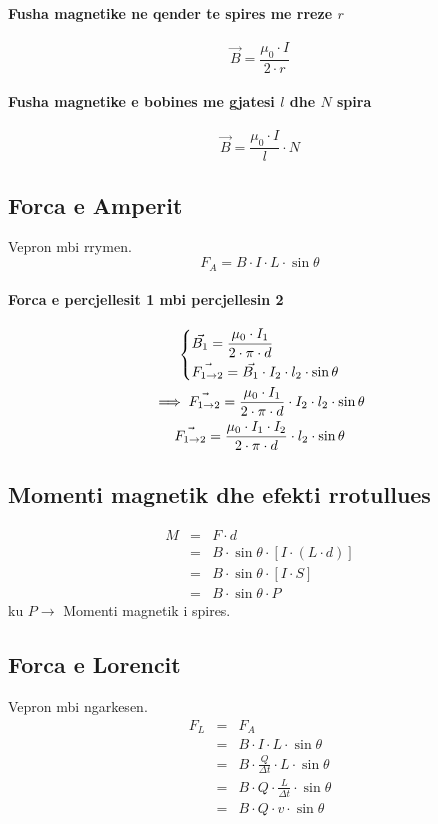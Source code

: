 \documentclass[a4paper, twocolumn]{article}
\begin{document}
\paragraph{Fusha magnetike ne qender te spires me rreze $r$}
\[
	\vec{B} = \frac{\mu_0 \cdot I}{2\cdot r}
\]
\paragraph{Fusha magnetike e bobines me gjatesi $l$ dhe $N$ spira}
\[
	\vec{B} = \frac{\mu_0 \cdot I}{l} \cdot N
\]
\subsection{Forca e Amperit}
Vepron mbi rrymen.
\[
	F_{A}=B\cdot I\cdot L\cdot \sin{\theta}
\]
\paragraph{Forca e percjellesit 1 mbi percjellesin 2}
\begin{gather*}
	\begin{dcases}
		\vec{B_1} = \frac{\mu_0\cdot I_1}{2\cdot \pi \cdot d} \\
		\vec{F_{1 \to 2}} = \vec{B_1} \cdot I_2 \cdot l_2 \cdot \sin\theta
	\end{dcases} \\
	\implies \vec{F_{1 \to 2}} = \frac{\mu_0\cdot I_1}{2\cdot \pi \cdot d} \cdot I_2 \cdot l_2 \cdot \sin\theta\\
	\vec{F_{1 \to 2}} = \frac{\mu_0\cdot I_1\cdot I_2}{2\cdot \pi\cdot d} \cdot l_2 \cdot \sin\theta
\end{gather*}
\subsection{Momenti magnetik dhe efekti rrotullues}
\begin{eqnarray*}
	M&=&F\cdot d\\
	 &=&B\cdot \sin{\theta} \cdot [I \cdot (L \cdot d)]\\
	 &=&B\cdot \sin{\theta}\cdot [I  \cdot S]\\
	 &=&B \cdot \sin{\theta} \cdot P
\end{eqnarray*}
ku $P\to$ Momenti magnetik i spires.
\subsection{Forca e Lorencit}
	Vepron mbi ngarkesen.
	\begin{eqnarray*} F_{L} &=& F_{A}\\
	      &=&B\cdot I\cdot L\cdot \sin{\theta}\\
	      &=&B\cdot \frac{Q}{\Delta t} \cdot L \cdot \sin{\theta}\\
	      &=&B\cdot Q\cdot \frac{L}{\Delta t}  \cdot \sin{\theta}\\
	      &=&B\cdot Q\cdot v\cdot \sin{\theta}\\
\end{eqnarray*}
\end{document}
